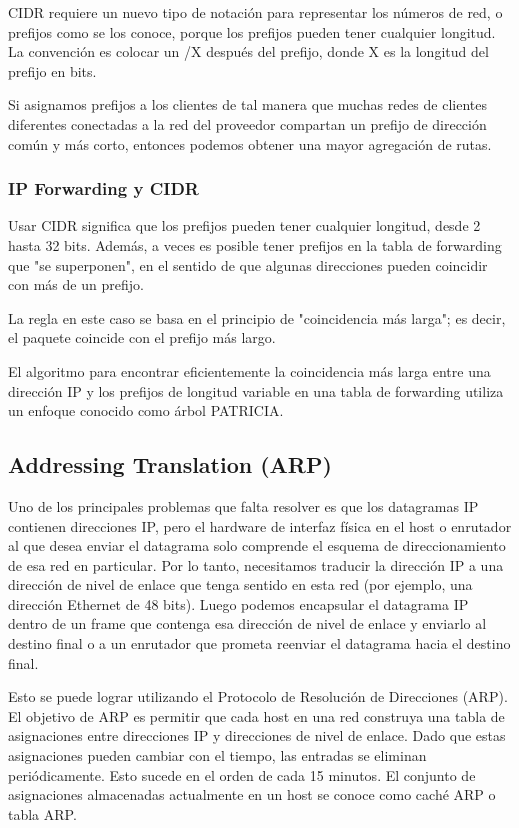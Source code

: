CIDR requiere un nuevo tipo de notación para representar los números de red, o prefijos como se los conoce, porque los prefijos pueden tener cualquier longitud. La convención es colocar un /X después del prefijo, donde X es la longitud del prefijo en bits.

Si asignamos prefijos a los clientes de tal manera que muchas redes de clientes diferentes conectadas a la red del proveedor compartan un prefijo de dirección común y más corto, entonces podemos obtener una mayor agregación de rutas.

\subsubsection*{IP Forwarding y CIDR}
Usar CIDR significa que los prefijos pueden tener cualquier longitud, desde 2 hasta 32 bits. Además, a veces es posible tener prefijos en la tabla de forwarding que "se superponen", en el sentido de que algunas direcciones pueden coincidir con más de un prefijo.

La regla en este caso se basa en el principio de "coincidencia más larga"; es decir, el paquete coincide con el prefijo más largo.

El algoritmo para encontrar eficientemente la coincidencia más larga entre una dirección IP y los prefijos de longitud variable en una tabla de forwarding utiliza un enfoque conocido como árbol PATRICIA.

\subsection{Addressing Translation (ARP)}
Uno de los principales problemas que falta resolver es que los datagramas IP contienen direcciones IP, pero el hardware de interfaz física en el host o enrutador al que desea enviar el datagrama solo comprende el esquema de direccionamiento de esa red en particular. Por lo tanto, necesitamos traducir la dirección IP a una dirección de nivel de enlace que tenga sentido en esta red (por ejemplo, una dirección Ethernet de 48 bits). Luego podemos encapsular el datagrama IP dentro de un frame que contenga esa dirección de nivel de enlace y enviarlo al destino final o a un enrutador que prometa reenviar el datagrama hacia el destino final.

Esto se puede lograr utilizando el Protocolo de Resolución de Direcciones (ARP). El objetivo de ARP es permitir que cada host en una red construya una tabla de asignaciones entre direcciones IP y direcciones de nivel de enlace. Dado que estas asignaciones pueden cambiar con el tiempo, las entradas se eliminan periódicamente. Esto sucede en el orden de cada 15 minutos. El conjunto de asignaciones almacenadas actualmente en un host se conoce como caché ARP o tabla ARP.


